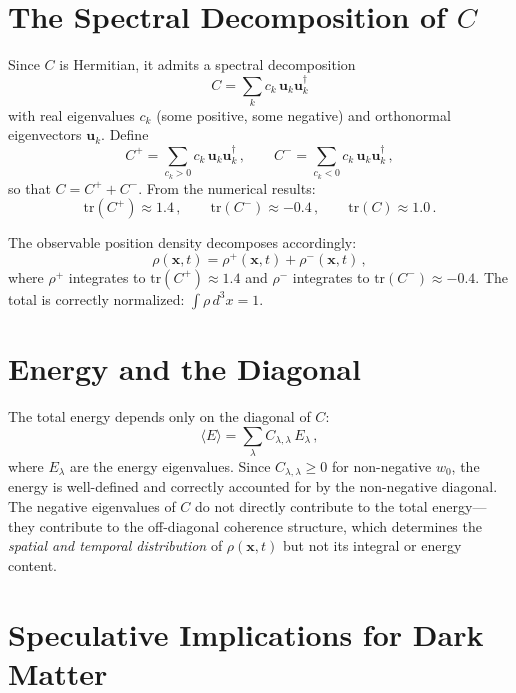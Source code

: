 \documentclass[12pt]{article}
\begin{document}
\section{The Spectral Decomposition of $C$}

Since $C$ is Hermitian, it admits a spectral decomposition
\begin{equation}
C = \sum_k c_k\, \mathbf{u}_k \mathbf{u}_k^\dagger
\end{equation}
with real eigenvalues $c_k$ (some positive, some negative) and orthonormal eigenvectors $\mathbf{u}_k$.  Define
\begin{equation}
C^+ = \sum_{c_k > 0} c_k\, \mathbf{u}_k \mathbf{u}_k^\dagger \,, \qquad
C^- = \sum_{c_k < 0} c_k\, \mathbf{u}_k \mathbf{u}_k^\dagger \,,
\end{equation}
so that $C = C^+ + C^-$.  From the numerical results:
\begin{equation}
\mathrm{tr}(C^+) \approx 1.4 \,, \qquad \mathrm{tr}(C^-) \approx -0.4 \,, \qquad \mathrm{tr}(C) \approx 1.0 \,.
\end{equation}

The observable position density decomposes accordingly:
\begin{equation}
\rho(\mathbf{x},t) = \rho^+(\mathbf{x},t) + \rho^-(\mathbf{x},t) \,,
\end{equation}
where $\rho^+$ integrates to $\mathrm{tr}(C^+) \approx 1.4$ and $\rho^-$ integrates to $\mathrm{tr}(C^-) \approx -0.4$.  The total is correctly normalized: $\int \rho\, d^3x = 1$.

\section{Energy and the Diagonal}

The total energy depends only on the diagonal of $C$:
\begin{equation}
\langle E \rangle = \sum_\lambda C_{\lambda,\lambda}\, E_\lambda \,,
\end{equation}
where $E_\lambda$ are the energy eigenvalues.  Since $C_{\lambda,\lambda} \geq 0$ for non-negative $w_0$, the energy is well-defined and correctly accounted for by the non-negative diagonal.  The negative eigenvalues of $C$ do not directly contribute to the total energy---they contribute to the off-diagonal coherence structure, which determines the \emph{spatial and temporal distribution} of $\rho(\mathbf{x},t)$ but not its integral or energy content.

\section{Speculative Implications for Dark Matter}
\end{document}
